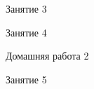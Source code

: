 \begin{class}[number=3]
	\begin{listofex}
		\item Занятие 3 
	\end{listofex}
\end{class}

\begin{class}[number=4]
	\begin{listofex}
		\item Занятие 4
	\end{listofex}
\end{class}

\begin{homework}[number=2]
	\begin{listofex}
		\item Домашняя работа 2
	\end{listofex}
\end{homework}

\begin{class}[number=5]
	\begin{listofex}
		\item Занятие 5
	\end{listofex}
\end{class}

